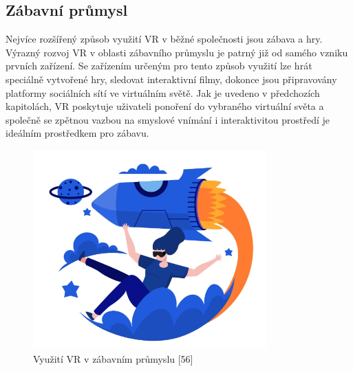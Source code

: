 \documentclass[a4paper, 12pt]{report}
\begin{document}
\subsection{Zábavní průmysl}
Nejvíce rozšířený způsob využití VR v běžné společnosti jsou zábava a hry. Výrazný rozvoj VR v oblasti zábavního průmyslu je patrný již od samého vzniku prvních zařízení. Se zařízením určeným pro tento způsob využití lze hrát speciálně vytvořené hry, sledovat interaktivní filmy, dokonce jsou připravovány platformy sociálních sítí ve virtuálním světě. Jak je uvedeno v předchozích kapitolách, VR poskytuje uživateli ponoření do vybraného virtuální světa a společně se zpětnou vazbou na smyslové vnímání i interaktivitou prostředí je ideálním prostředkem pro zábavu.  

\begin{figure}[h!]
	\centering
	\includegraphics[width=9cm]{zabava.jpg}
	\caption{Využití VR v zábavním průmyslu [56]}
\end{figure}
 
\end{document}
